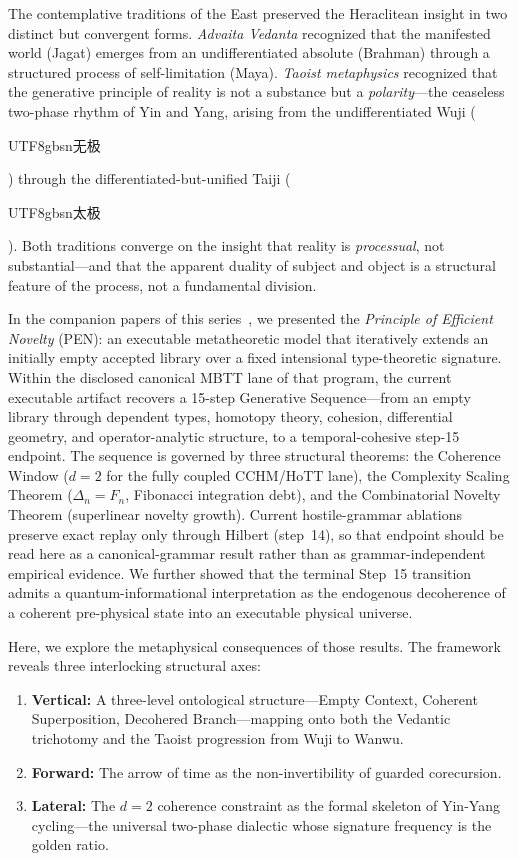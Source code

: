 \documentclass[12pt,a4paper]{article}
\begin{document}
The contemplative traditions of the East preserved the Heraclitean insight in two distinct but convergent forms. \emph{Advaita Vedanta} recognized that the manifested world (Jagat) emerges from an undifferentiated absolute (Brahman) through a structured process of self-limitation (Maya). \emph{Taoist metaphysics} recognized that the generative principle of reality is not a substance but a \emph{polarity}---the ceaseless two-phase rhythm of Yin and Yang, arising from the undifferentiated Wuji (\begin{CJK}{UTF8}{gbsn}无极\end{CJK}) through the differentiated-but-unified Taiji (\begin{CJK}{UTF8}{gbsn}太极\end{CJK}). Both traditions converge on the insight that reality is \emph{processual}, not substantial---and that the apparent duality of subject and object is a structural feature of the process, not a fundamental division.

In the companion papers of this series~\cite{pen1, pen2}, we presented the \emph{Principle of Efficient Novelty} (PEN): an executable metatheoretic model that iteratively extends an initially empty accepted library over a fixed intensional type-theoretic signature. Within the disclosed canonical MBTT lane of that program, the current executable artifact recovers a 15-step Generative Sequence---from an empty library through dependent types, homotopy theory, cohesion, differential geometry, and operator-analytic structure, to a temporal-cohesive step-15 endpoint. The sequence is governed by three structural theorems: the Coherence Window ($d = 2$ for the fully coupled CCHM/HoTT lane), the Complexity Scaling Theorem ($\Delta_n = F_n$, Fibonacci integration debt), and the Combinatorial Novelty Theorem (superlinear novelty growth). Current hostile-grammar ablations preserve exact replay only through Hilbert (step~14), so that endpoint should be read here as a canonical-grammar result rather than as grammar-independent empirical evidence. We further showed that the terminal Step~15 transition admits a quantum-informational interpretation as the endogenous decoherence of a coherent pre-physical state into an executable physical universe.

Here, we explore the metaphysical consequences of those results. The framework reveals three interlocking structural axes:

\begin{enumerate}[label=(\roman*)]
\item \textbf{Vertical:} A three-level ontological structure---Empty Context, Coherent Superposition, Decohered Branch---mapping onto both the Vedantic trichotomy and the Taoist progression from Wuji to Wanwu.
\item \textbf{Forward:} The arrow of time as the non-invertibility of guarded corecursion.
\item \textbf{Lateral:} The $d = 2$ coherence constraint as the formal skeleton of Yin-Yang cycling---the universal two-phase dialectic whose signature frequency is the golden ratio.
\end{enumerate}
\end{document}
